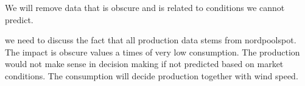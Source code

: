 We will remove data that is obscure and is related to conditions we cannot predict. 

we need to discuss the fact that all production data stems from nordpoolspot. The impact is obscure values a times of very low consumption. The production would not make sense in decision making if not predicted based on market conditions. The consumption will decide production together with wind speed.